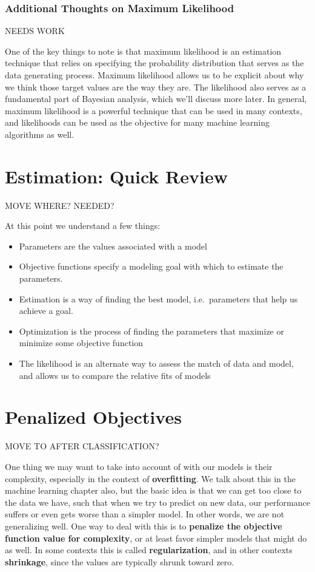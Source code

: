 \documentclass[
  letterpaper,
]{krantz}
\providecommand{\tightlist}{%
  \setlength{\itemsep}{0pt}\setlength{\parskip}{0pt}}\usepackage{longtable,booktabs,array}
\begin{document}
\subsubsection{Additional Thoughts on Maximum
Likelihood}\label{additional-thoughts-on-maximum-likelihood}

NEEDS WORK

One of the key things to note is that maximum likelihood is an
estimation technique that relies on specifying the probability
distribution that serves as the data generating process. Maximum
likelihood allows us to be explicit about why we think those target
values are the way they are. The likelihood also serves as a fundamental
part of Bayesian analysis, which we'll discuss more later. In general,
maximum likelihood is a powerful technique that can be used in many
contexts, and likelihoods can be used as the objective for many machine
learning algorithms as well.

\section{Estimation: Quick Review}\label{estimation-quick-review}

MOVE WHERE? NEEDED?

At this point we understand a few things:

\begin{itemize}
\tightlist
\item
  Parameters are the values associated with a model
\item
  Objective functions specify a modeling goal with which to estimate the
  parameters.
\item
  Estimation is a way of finding the best model, i.e.~parameters that
  help us achieve a goal.
\item
  Optimization is the process of finding the parameters that maximize or
  minimize some objective function
\item
  The likelihood is an alternate way to assess the match of data and
  model, and allows us to compare the relative fits of models
\end{itemize}

\section{Penalized Objectives}\label{penalized-objectives}

MOVE TO AFTER CLASSIFICATION?

One thing we may want to take into account of with our models is their
complexity, especially in the context of \textbf{overfitting}. We talk
about this in the machine learning chapter also, but the basic idea is
that we can get too close to the data we have, such that when we try to
predict on new data, our performance suffers or even gets worse than a
simpler model. In other words, we are not generalizing well. One way to
deal with this is to \textbf{penalize the objective function value for
complexity}, or at least favor simpler models that might do as well. In
some contexts this is called \textbf{regularization}, and in other
contexts \textbf{shrinkage}, since the values are typically shrunk
toward zero.
\end{document}
